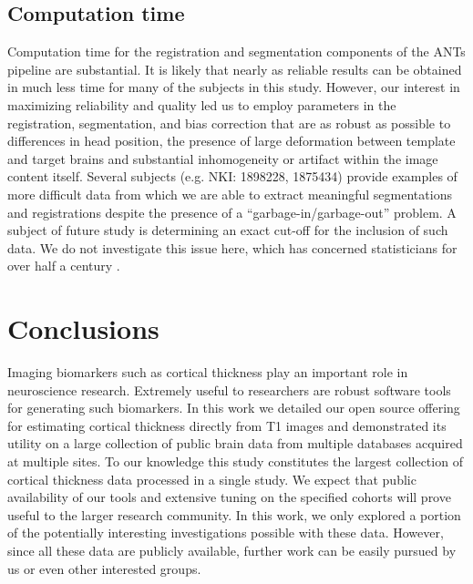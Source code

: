 \subsection{Computation time}
Computation time for the registration and segmentation components of
the ANTs pipeline are substantial.  It is likely that nearly as reliable
results can be obtained in much less time for many of the subjects in
this study.  However, our interest in
maximizing reliability and quality led us to employ parameters in the
registration, segmentation, and bias correction that are as robust as
possible to differences in head position, the presence of large
deformation between template and target brains and substantial
inhomogeneity or artifact within the image content itself.  Several
subjects (e.g. NKI: 1898228, 1875434) provide examples of more difficult 
data from which we are able to
extract meaningful segmentations and registrations despite the presence of a
``garbage-in/garbage-out'' problem.  A subject of future study is
determining an exact cut-off for the inclusion of such data.  We do not
investigate this issue here, which has concerned statisticians for over
half a century \cite{Hampel2001}. 

\section{Conclusions}

Imaging biomarkers such as cortical thickness play an 
important role in neuroscience research.  Extremely useful to
researchers are robust software tools for generating such 
biomarkers.  In this work we detailed our open source offering for estimating
cortical thickness directly from T1 images and demonstrated
its utility on a large collection of public brain data from
multiple databases acquired at multiple sites.  To our knowledge
this study constitutes the largest collection of cortical
thickness data processed in a single study.  
We expect that public availability of our tools and extensive tuning on 
the specified cohorts will prove useful to the larger
research community.   In this work, we only explored a portion of the potentially
interesting investigations possible with these data.  However,
since all these data are publicly available, further work can
be easily pursued by us or even other interested groups.  